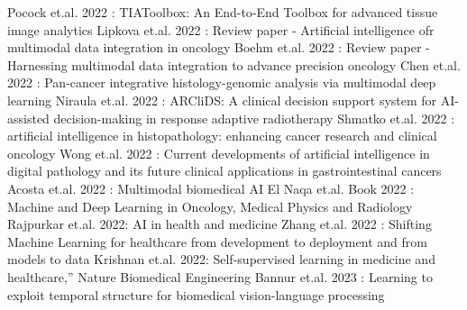 \documentclass{article}%
\begin{document}
\newline%
\newline%
%
Pocock et.al. 2022 : TIAToolbox: An End{-}to{-}End Toolbox for advanced tissue image analytics%
\newline%
\newline%
%
Lipkova et.al. 2022 : Review paper {-} Artificial intelligence ofr multimodal data integration in oncology%
\newline%
\newline%
%
Boehm et.al. 2022 : Review paper {-} Harnessing multimodal data integration to advance precision oncology%
\newline%
\newline%
%
Chen et.al. 2022 : Pan{-}cancer integrative histology{-}genomic analysis via multimodal deep learning%
\newline%
\newline%
%
Niraula et.al. 2022 : ARCliDS: A clinical decision support system for AI{-}assisted decision{-}making in response adaptive radiotherapy%
\newline%
\newline%
%
Shmatko et.al. 2022 : artificial intelligence in histopathology: enhancing cancer research and clinical oncology%
\newline%
\newline%
%
Wong et.al. 2022 : Current developments of artificial intelligence in digital pathology and its future clinical applications in gastrointestinal cancers%
\newline%
\newline%
%
Acosta et.al. 2022 : Multimodal biomedical AI%
\newline%
\newline%
%
El Naqa et.al. Book 2022 : Machine and Deep Learning in Oncology, Medical Physics and Radiology%
\newline%
\newline%
%
Rajpurkar et.al. 2022: AI in health and medicine%
\newline%
\newline%
%
Zhang et.al. 2022 : Shifting Machine Learning for healthcare from development to deployment and from models to data%
\newline%
\newline%
%
Krishnan et.al. 2022: Self{-}supervised learning in medicine and healthcare,” Nature Biomedical Engineering%
\newline%
\newline%
%
Bannur et.al. 2023 : Learning to exploit temporal structure for biomedical vision{-}language processing%
\end{document}
